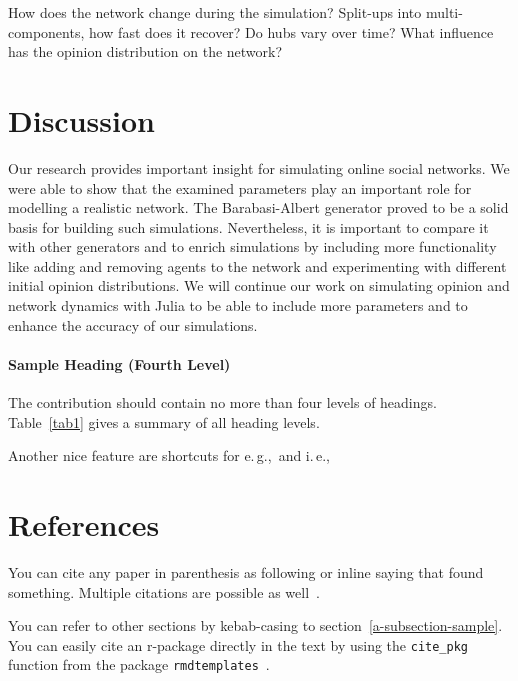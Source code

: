 \documentclass[runningheads]{llncs}
\newcommand{\eg}{e.\,g.,\ }
\newcommand{\ie}{i.\,e.,\ }
\begin{document}
How does the network change during the simulation? Split-ups into
multi-components, how fast does it recover? Do hubs vary over time? What
influence has the opinion distribution on the network?

\hypertarget{discussion}{%
\section{Discussion}\label{discussion}}

Our research provides important insight for simulating online social
networks. We were able to show that the examined parameters play an
important role for modelling a realistic network. The Barabasi-Albert
generator proved to be a solid basis for building such simulations.
Nevertheless, it is important to compare it with other generators and to
enrich simulations by including more functionality like adding and
removing agents to the network and experimenting with different initial
opinion distributions. We will continue our work on simulating opinion
and network dynamics with Julia to be able to include more parameters
and to enhance the accuracy of our simulations.

\hypertarget{sample-heading-fourth-level}{%
\paragraph{Sample Heading (Fourth
Level)}\label{sample-heading-fourth-level}}

The contribution should contain no more than four levels of headings.
Table~\ref{tab1} gives a summary of all heading levels.

Another nice feature are shortcuts for \eg and \ie 

\hypertarget{references}{%
\section{References}\label{references}}

You can cite any paper in parenthesis as following
\autocite{valdez2017priming} or inline saying that
\textcite{valdez2017priming} found something. Multiple citations are
possible as well~\autocite{valdez2017priming,valdez2019users}.

You can refer to other sections by kebab-casing to
section~\ref{a-subsection-sample}. You can easily cite an r-package
directly in the text by using the \texttt{cite\_pkg} function from the
package \texttt{rmdtemplates}~\autocite{R-rmdtemplates}.
\end{document}
